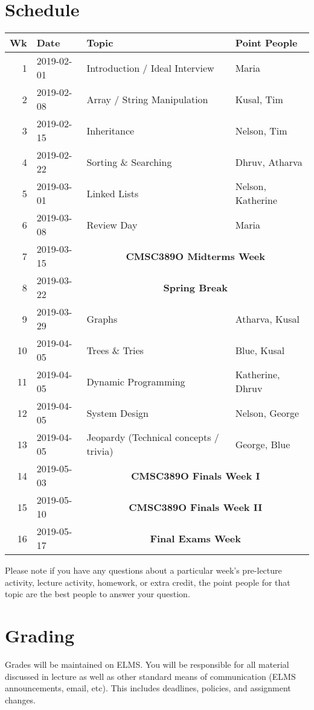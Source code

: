 \documentclass[12pt]{article}
\begin{document}
\section*{Schedule}
\begin{table}[h!]
  \begin{tabular}{@{}rlll}
    Wk & Date & Topic & Point People \\
    \hline
    1 & 2019-02-01 & Introduction / Ideal Interview & Maria \\
    2 & 2019-02-08 & Array / String Manipulation    & Kusal, Tim \\
    3 & 2019-02-15 & Inheritance                    & Nelson, Tim \\
    4 & 2019-02-22 & Sorting \& Searching           & Dhruv, Atharva \\
    5 & 2019-03-01 & Linked Lists                   & Nelson, Katherine \\
    6 & 2019-03-08 & Review Day                     & Maria \\
    7 & 2019-03-15 & \multicolumn{2}{c}{\textbf{CMSC389O Midterms Week}} \\
    8 & 2019-03-22 & \multicolumn{2}{c}{\textbf{Spring Break}} \\
    9 & 2019-03-29 & Graphs                         & Atharva, Kusal \\
    10& 2019-04-05 & Trees \& Tries                 & Blue, Kusal \\
    11& 2019-04-05 & Dynamic Programming            & Katherine, Dhruv \\
    12& 2019-04-05 & System Design                  & Nelson, George \\
    13& 2019-04-05 & Jeopardy (Technical concepts / trivia) & George, Blue \\
    14& 2019-05-03 & \multicolumn{2}{c}{\textbf{CMSC389O Finals Week I}} \\
    15& 2019-05-10 & \multicolumn{2}{c}{\textbf{CMSC389O Finals Week II}} \\
    16& 2019-05-17 & \multicolumn{2}{c}{\textbf{Final Exams Week}}
  \end{tabular}
\end{table}

Please note if you have any questions about a particular week’s pre-lecture activity, lecture activity, homework, or extra credit, the point people for that topic are the best people to answer your question.

\section*{Grading}
\noindent Grades will be maintained on ELMS.
You will be responsible for all material discussed in lecture as well as other standard means of communication (ELMS announcements, email, etc).
This includes deadlines, policies, and assignment changes.
\end{document}
